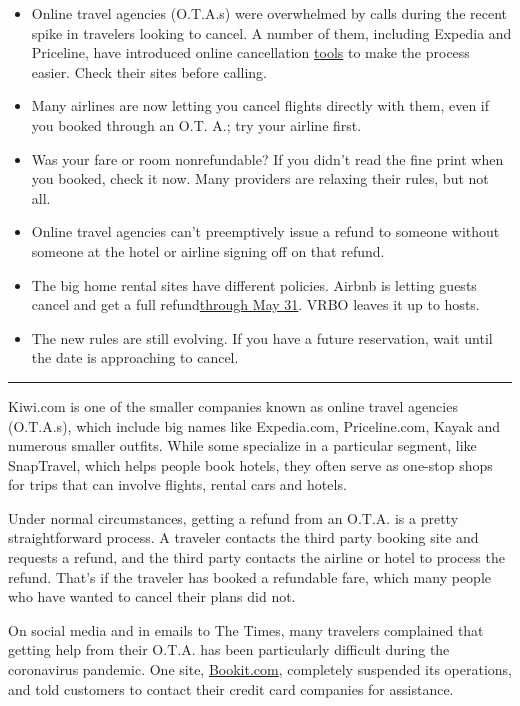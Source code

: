 \begin{itemize}
\item
  Online travel agencies (O.T.A.s) were overwhelmed by calls during the
  recent spike in travelers looking to cancel. A number of them,
  including Expedia and Priceline, have introduced online cancellation
  \href{https://www.priceline.com/help-page/faq/237898/advisories-\&-covid-19-information-}{tools}
  to make the process easier. Check their sites before calling.
\item
  Many airlines are now letting you cancel flights directly with them,
  even if you booked through an O.T. A.; try your airline first.
\item
  Was your fare or room nonrefundable? If you didn't read the fine print
  when you booked, check it now. Many providers are relaxing their
  rules, but not all.
\item
  Online travel agencies can't preemptively issue a refund to someone
  without someone at the hotel or airline signing off on that refund.
\item
  The big home rental sites have different policies. Airbnb is letting
  guests cancel and get a full
  refund\href{https://news.airbnb.com/a-letter-to-hosts/}{through May
  31}. VRBO leaves it up to hosts.
\item
  The new rules are still evolving. If you have a future reservation,
  wait until the date is approaching to cancel.
\end{itemize}

\begin{center}\rule{0.5\linewidth}{\linethickness}\end{center}

Kiwi.com is one of the smaller companies known as online travel agencies
(O.T.A.s), which include big names like Expedia.com, Priceline.com,
Kayak and numerous smaller outfits. While some specialize in a
particular segment, like SnapTravel, which helps people book hotels,
they often serve as one-stop shops for trips that can involve flights,
rental cars and hotels.

Under normal circumstances, getting a refund from an O.T.A. is a pretty
straightforward process. A traveler contacts the third party booking
site and requests a refund, and the third party contacts the airline or
hotel to process the refund. That's if the traveler has booked a
refundable fare, which many people who have wanted to cancel their plans
did not.

On social media and in emails to The Times, many travelers complained
that getting help from their O.T.A. has been particularly difficult
during the coronavirus pandemic. One site,
\href{https://bookit.com/covid-19/}{Bookit.com}, completely suspended
its operations, and told customers to contact their credit card
companies for assistance.

